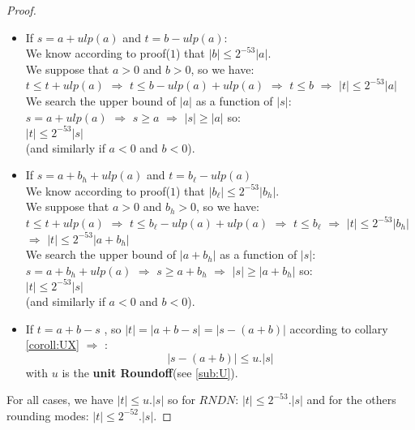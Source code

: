 \begin{proof}
\begin{itemize}
\item If $s = a +ulp(a)$ and $t = b -ulp(a)$:\\
We know according to  proof($1$) that $\lvert b \rvert \le 2^{-53} \lvert a \rvert$.\\
We suppose that $a>0$ and $b>0$, so we have:\\
$t \le t+ulp(a)$ $\Rightarrow$ $t \le b - ulp(a) + ulp(a)$ $\Rightarrow$ $t \le b$ 
$\Rightarrow$ $\lvert t \rvert \le 2^{-53} \lvert a \rvert $\\
We search the upper bound of $\lvert a \rvert $ as a function of $\lvert s \rvert$:\\
$s = a+ ulp(a)$ $\Rightarrow$ $s \ge a$ $\Rightarrow$ $\lvert s \rvert \ge \lvert a \rvert $ so:\\
$\lvert t \rvert \le 2^{-53} \lvert s \rvert $ \\
(and similarly if $a<0$ and $b<0$).\\


\item If $s = a + b_h + ulp(a)$ and $t = b_{\ell} -ulp(a)$\\
We know according to  proof($1$) that $\lvert b_{\ell} \rvert \le 2^{-53} \lvert b_h \rvert$.\\
We suppose that $a>0$ and $b_h>0$, so we have:\\
$t \le t+ulp(a)$ $\Rightarrow$ $t \le b_{\ell} - ulp(a) + ulp(a)$ $\Rightarrow$ $t \le b_{\ell}$ 
$\Rightarrow$ $\lvert t \rvert \le 2^{-53} \lvert b_h\rvert $  $\Rightarrow$ $\lvert t \rvert \le 2^{-53} \lvert a +b_h\rvert $\\
We search the upper bound of $\lvert a + b_h \rvert $ as a function of $\lvert s \rvert$:\\
$s = a+ b_h +ulp(a)$ $\Rightarrow$ $s \ge a + b_h$ $\Rightarrow$ $\lvert s \rvert \ge \lvert a + b_h \rvert $ so:\\
$\lvert t \rvert \le 2^{-53} \lvert s \rvert $ \\
(and similarly if $a<0$ and $b<0$).\\

\item If $t = a+b -s$ , so  $\lvert t \rvert = \lvert a+b-s \rvert = \lvert s-(a+b) \rvert $  according to collary \ref{coroll:UX} $\Rightarrow$ :\\
$$\lvert s-(a+b) \rvert \le u.\lvert s \rvert$$ with $u$ is the \textbf{unit Roundoff}(see \ref{sub:U}).
\end{itemize}
For all cases,  we have $\lvert t \rvert \le u. \lvert s \rvert$ so for $RNDN$: $\lvert t \rvert \le 2^{-53}. \lvert s \rvert$ and for the others rounding modes: $\lvert t \rvert \le 2^{-52}. \lvert s \rvert$.
\end{proof}
